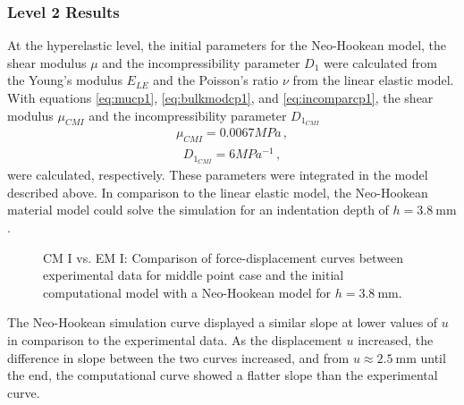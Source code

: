 \subsubsection*{Level 2 Results}
\label{subsection:level2cmI}
At the hyperelastic level, the initial parameters for the Neo-Hookean model, 
the shear modulus $\mu$ and the incompressibility parameter $D_1$ were calculated from the Young's modulus $E_{LE}$
and the Poisson's ratio $\nu$ from the linear elastic model. With equations \ref{eq:mucp1}, \ref{eq:bulkmodcp1}, 
and \ref{eq:incomparcp1}, the shear modulus $\mu_{CMI}$ and the incompressibility parameter $D_{1_{CMI}}$
\begin{align}
    \mu_{CMI} = 0.0067 MPa \, ,
    \label{eq:mucp1result}
\end{align}
\begin{align}
    D_{1_{CMI}} = 6 MPa^{-1} \, ,
    \label{eq:d1cp1result}
\end{align}
were calculated, respectively. These parameters were integrated in the model described above. In comparison to 
the linear elastic model, the Neo-Hookean material model could solve the simulation for an indentation depth of 
$h =  \SI{3.8}{\milli \meter}$.
\begin{figure}%
    \centering
   \quad
   \caption[Computational model I vs. Experimental data - Neo-Hookean]{CM I vs. EM I: Comparison of force-displacement curves between experimental data for middle point case and the initial computational model with a Neo-Hookean model for $h = \SI{3.8}{\milli \meter}$.}%
   \label{fig:MPIvsCPINH}%
\end{figure}
The Neo-Hookean simulation curve displayed a similar slope at lower values of $u$ in comparison to the experimental data.
As the displacement $u$ increased, the difference in slope between the two curves increased, and from $u \approx \SI{2.5}{\milli \meter}$
until the end, the computational curve showed a flatter slope than the experimental curve.\\


